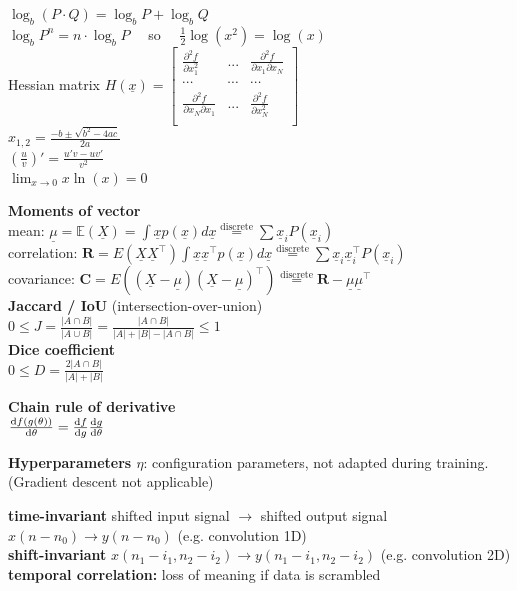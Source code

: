 \documentclass[a4paper,10pt,landscape]{article}
\newcommand{\bbE}{\mathbb{E}}
\newcommand{\x}{\underline{x}}
\newcommand{\X}{\underline{X}}
\newcommand{\umu}{\underline{\mu}}
\begin{document}
\begin{multicols*}{3}
    $\log_b(P \cdot Q) = \log_b P + \log_b Q $\\
    $\log_b P^n = n \cdot \log_b P \quad$ so $ \quad \frac{1}{2}\log(x^2) = \log(x)$\\
    Hessian matrix $H(\x) = \begin{bmatrix}
                \frac{\partial^2 f}{\partial x_1^2} & ... & \frac{\partial^2 f}{\partial x_1 \partial x_N}\\
                \cdots & \cdots & \cdots \\
                \frac{\partial^2 f}{\partial x_N \partial x_1} & ... & \frac{\partial^2 f}{\partial x_N^2}\\
                \end{bmatrix}$ \\
    ${\displaystyle x_{1,2}={\frac {-b\pm {\sqrt {b^{2}-4ac}}}{2a}}}$\\
    $(\frac{u}{v})' = \frac{u'v - uv'}{v^2}$\\
    $\lim_{x\to0} x\ln(x) = 0$

    \textbf{Moments of vector}\\
    mean: $\underline{\mu} = \bbE(\X) = \int \x p(\x) d\x 
    \stackrel{\textrm{discrete}}{=} \sum \x_iP(\x_i) $ \\
    correlation: $\mathbf{R} = E(\X\X^\intercal) \int \x\x^\intercal p(\x) d\x
    \stackrel{\textrm{discrete}}{=} \sum \x_i\x_i^\intercal P(\x_i) $ \\
    covariance: $\mathbf{C} = E((\X-\umu)(\X-\umu)^\intercal)
    \stackrel{\textrm{discrete}}{=} \mathbf{R}- \umu\umu^\intercal $ \\
    
    \textbf{Jaccard / IoU} (intersection-over-union)\\
    $0\leq J = \frac{|A \cap B|}{|A \cup B|} =  \frac{|A \cap B|}{|A| + |B| - |A \cap B|} \leq 1$ \\
    \textbf{Dice coefficient}\\
    $0\leq D = \frac{2|A \cap B|}{|A| + |B|}$
    
    \textbf{Chain rule of derivative}\\
    $\dv{f(g(\theta))}{\theta} = \dv{f}{g} \dv{g}{\theta}$

    \textbf{Hyperparameters $\eta$}: configuration parameters, not adapted during training. (Gradient descent not applicable)

    \textbf{time-invariant} shifted input signal $\rightarrow$ shifted output signal $x(n-n_0) \rightarrow y(n-n_0)$ (e.g. convolution 1D)\\
    \textbf{shift-invariant} $x(n_1-i_1, n_2-i_2) \rightarrow y(n_1-i_1, n_2-i_2)$ (e.g. convolution 2D)\\
    \textbf{temporal correlation:} loss of meaning if data is scrambled\\


\end{multicols*}
\end{document}
